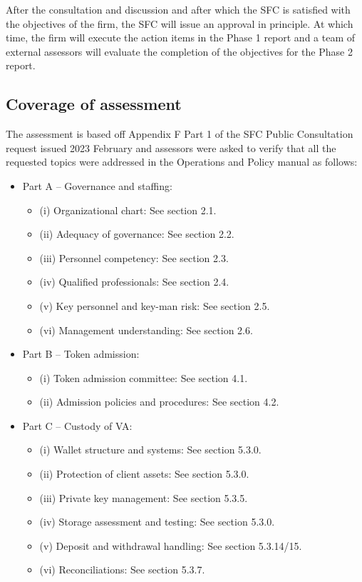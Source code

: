 \documentclass[]{report}
\begin{document}
After the consultation and discussion and after which the SFC is
satisfied with the objectives of the firm, the SFC will issue an
approval in principle.  At which time, the firm will execute the
action items in the Phase 1 report and a team of external assessors
will evaluate the completion of the objectives for the Phase 2 report.

\subsection{Coverage of assessment}
The assessment is based off Appendix F Part 1 of the SFC Public
Consultation request issued 2023 February and assessors were asked to
verify that all the requested topics were addressed in the
Operations and Policy manual as follows:
\begin{itemize}
\item Part A – Governance and staffing:
  \begin{itemize}
\item (i) Organizational chart: See section 2.1.
\item (ii) Adequacy of governance: See section 2.2.
\item (iii) Personnel competency: See section 2.3.
\item (iv) Qualified professionals: See section 2.4.
\item (v) Key personnel and key-man risk: See section 2.5.
\item (vi) Management understanding: See section 2.6.
\end{itemize}
\item Part B – Token admission:
\begin{itemize}
\item (i) Token admission committee: See section 4.1.
\item (ii) Admission policies and procedures: See section 4.2.
\end{itemize}

\item Part C – Custody of VA:
\begin{itemize}
\item (i) Wallet structure and systems: See section 5.3.0.
\item (ii) Protection of client assets: See section 5.3.0.
\item (iii) Private key management: See section 5.3.5.
\item (iv) Storage assessment and testing: See section 5.3.0.
\item (v) Deposit and withdrawal handling: See section 5.3.14/15.
\item (vi) Reconciliations: See section 5.3.7.
\end{itemize}


\end{itemize}
\end{document}
